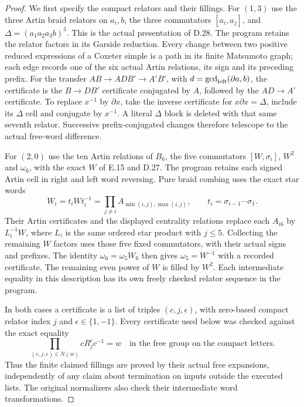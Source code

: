 \begin{proof}
We first specify the compact relators and their fillings.
For $(1,3)$ use the three Artin braid relators on
$a_i,b$, the three commutators $[a_i,a_j]$, and
$\Delta=(a_1a_2a_3b)^3$.  This is the actual presentation
of D.28.  The program 
retains the relator factors in its Garside reduction.
Every change between two positive reduced expressions
of a Coxeter simple is a path in its finite Matsumoto
graph; each edge records one of the six actual Artin
relations, its sign and its preceding prefix.
For the transfer
$AB\to AD B'\to A'B'$, with
$d=\gcd_{\rm left}(\partial a,b)$,
the certificate is the $B\to DB'$ certificate conjugated
by $A$, followed by the $AD\to A'$ certificate.
To replace $x^{-1}$ by $\partial x$, take the inverse
certificate for $x\partial x=\Delta$, include its
$\Delta$ cell and conjugate by $x^{-1}$.
A literal $\Delta$ block is deleted with that same
seventh relator.  Successive prefix-conjugated changes
therefore telescope to the actual free-word difference.

For $(2,0)$ use the ten Artin relations of $B_6$,
the five commutators $[W,\sigma_i]$, $W^2$ and
$\omega_6$, with the exact $W$ of E.15 and D.27.
The program  retains each
signed Artin cell in right and left word reversing.
Pure braid combing uses the exact star words
\[
 W_i=t_iWt_i^{-1}
     =\prod_{j\ne i}A_{\min(i,j),\max(i,j)},\qquad
 t_i=\sigma_{i-1}\cdots\sigma_1.
\]
Their Artin certificates and the displayed centrality
relations replace each $A_{i6}$ by $L_i^{-1}W$, where
$L_i$ is the same ordered star product with $j\leq5$.
Collecting the remaining $W$ factors uses those five
fixed commutators, with their actual signs and prefixes.
The identity $\omega_6=\omega_5W_6$ then gives
$\omega_5=W^{-1}$ with a recorded certificate.
The remaining even power of $W$ is filled by $W^2$.
Each intermediate equality in this description has
its own freely checked relator sequence in the program.

In both cases a certificate is a list of triples
$(c,j,\epsilon)$, with zero-based compact relator index
$j$ and $\epsilon\in\{1,-1\}$.  Every certificate used
below was checked against the exact equality
\[
 \prod_{(c,j,\epsilon)\in N(w)}
            cR_j^\epsilon c^{-1}=w
       \quad\text{in the free group on the compact letters}.
                                                               \tag{D.80}
\]
Thus the finite claimed fillings are proved by their
actual free expansions, independently of any claim
about termination on inputs outside the executed lists.
The original normalizers also check their intermediate
word transformations.


\end{proof}
